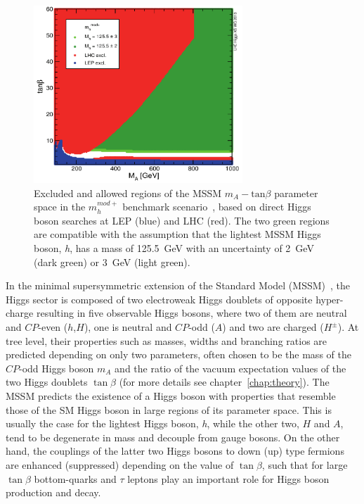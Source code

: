 \begin{figure}[tp]
     \begin{center}

            \includegraphics[width=0.7\textwidth]{figure/mh_mod.png}

    \end{center}
    \caption{Excluded and allowed regions of the MSSM  $m_{A} - \text{tan}\beta$ parameter space in the $m_{h}^{mod+}$ 
	benchmark scenario~\cite{LHCxsec}, based on direct Higgs boson searches at LEP 
	(blue) and LHC (red). The two green regions are compatible with the assumption that 
	the lightest MSSM Higgs boson, \emph{h}, has a mass of 125.5~GeV with an uncertainty of 2~GeV (dark green) 
	or 3~GeV (light green). }
   \label{fig:mhmod}
\end{figure}

In the minimal supersymmetric extension of the Standard Model
(MSSM)~\cite{MSSM1, MSSM2}, the Higgs sector is composed of two electroweak Higgs
doublets of opposite hyper-charge resulting in five observable Higgs
bosons, where two of them are neutral and $CP$-even
($h$,$H$), one is neutral and $CP$-odd ($A$) and two are charged
($H^\pm$).  At tree level, their properties such as masses, widths and
branching ratios are predicted depending on  only two parameters,
often chosen to be the mass of the $CP$-odd Higgs boson $m_A$ and
the ratio of the vacuum expectation values of the two Higgs doublets
$\tan\beta$ (for more details see chapter~\ref{chap:theory}).  
The MSSM predicts the existence of a Higgs boson with properties that  
resemble those of the SM Higgs boson in large regions of its parameter space. 
This is usually the case for the lightest Higgs boson, \emph{h}, while the other two, $H$ and $A$, 
tend to be degenerate in mass and decouple from gauge bosons.
On the other hand, the couplings of the latter two Higgs bosons to down (up) type fermions are enhanced
(suppressed) depending on the value of $\tan\beta$, such that for large $\tan\beta$
bottom-quarks and $\tau$ leptons  play an important role for Higgs boson production and decay. 
 

